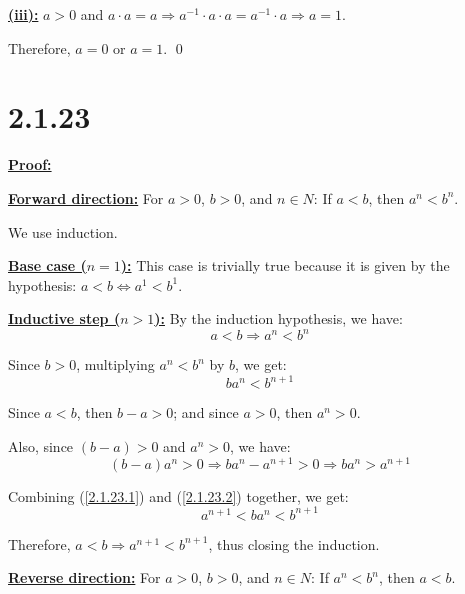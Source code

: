 \documentclass{article}
\begin{document}
\noindent
\textbf{\underline{(iii):}} $a>0$ and $a \cdot a = a \Rightarrow a^{-1} \cdot a \cdot a = a^{-1} \cdot a \Rightarrow a = 1$.
\newline

\noindent
Therefore, $a=0$ or $a=1$.
\qed
\newline

\section*{2.1.23}
\textbf{\underline{Proof:}}
\newline

\noindent
\textbf{\underline{Forward direction:}} For $a>0$, $b>0$, and $n \in N$: If $a<b$, then $a^n<b^n$.
\newline

\noindent
We use induction.
\newline

\noindent
\textbf{\underline{Base case ($n=1$):}} This case is trivially true because it is given by the hypothesis: $a<b \iff a^1 < b^1$.
\newline

\noindent
\textbf{\underline{Inductive step ($n>1$):}} By the induction hypothesis, we have: 
\begin{equation*}
  a<b \Rightarrow a^n < b^n
\end{equation*}


\noindent
Since $b>0$, multiplying $a^n < b^n$ by $b$, we get:
\begin{equation}
  ba^n < b^{n+1} \label{2.1.23.1}
\end{equation}

\noindent
Since $a<b$, then $b-a>0$; and since $a>0$, then $a^n>0$.

\noindent
Also, since $(b-a)>0$ and $a^n>0$, we have: 
\begin{equation}
  (b-a)a^n > 0 \Rightarrow ba^n - a^{n+1} > 0 \Rightarrow ba^n > a^{n+1} \label{2.1.23.2}
\end{equation}

\noindent
Combining (\ref{2.1.23.1}) and (\ref{2.1.23.2}) together, we get:
\begin{equation*}
  a^{n+1} < ba^n < b^{n+1}
\end{equation*}

\noindent
Therefore, $a<b \Rightarrow a^{n+1} < b^{n+1}$, thus closing the induction.
\newline

\noindent
\textbf{\underline{Reverse direction:}} For $a>0$, $b>0$, and $n \in N$: If $a^n<b^n$, then $a<b$.
\newline
\end{document}
